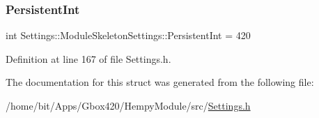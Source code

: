 \subsubsection{\texorpdfstring{Persistent\+Int}{PersistentInt}}
{\footnotesize\ttfamily int Settings\+::\+Module\+Skeleton\+Settings\+::\+Persistent\+Int = 420}



Definition at line 167 of file Settings.\+h.



The documentation for this struct was generated from the following file\+:\begin{DoxyCompactItemize}
\item 
/home/bit/\+Apps/\+Gbox420/\+Hempy\+Module/src/\hyperlink{_hempy_module_2src_2_settings_8h}{Settings.\+h}\end{DoxyCompactItemize}
